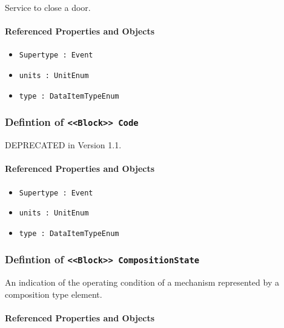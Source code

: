 Service to close a door.

\FloatBarrier
\paragraph{Referenced Properties and Objects}

\begin{itemize}
\item \texttt{Supertype : Event}

\item \texttt{units : UnitEnum}

\item \texttt{type : DataItemTypeEnum}

\end{itemize}
\FloatBarrier
\subsubsection{Defintion of \texttt{<<Block>> Code}}
  \label{type:Code}

\FloatBarrier

DEPRECATED in Version 1.1.

\FloatBarrier
\paragraph{Referenced Properties and Objects}

\begin{itemize}
\item \texttt{Supertype : Event}

\item \texttt{units : UnitEnum}

\item \texttt{type : DataItemTypeEnum}

\end{itemize}
\FloatBarrier
\subsubsection{Defintion of \texttt{<<Block>> CompositionState}}
  \label{type:CompositionState}

\FloatBarrier

An indication of the operating condition of a mechanism represented by a composition type element.

\FloatBarrier
\paragraph{Referenced Properties and Objects}

